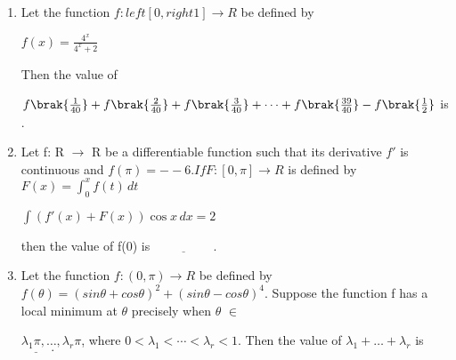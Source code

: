 \documentclass{article}
\begin{document}
\begin{enumerate}
\item Let the function $f:left[0, right1] \to R$ be defined by

      $f(x) = \frac{4^x}{4^x + 2}$
      
Then the value of
      
	$f\brak{\frac{1}{40}} + f\brak{\frac{2}{40}} + f\brak{\frac{3}{40}} + \dots + f\brak{\frac{39}{40}} - f\brak{\frac{1}{2}}$ 
	is \underline{\hspace{2cm}}.

\item Let f: R $\to$ R be a differentiable function such that its derivative $f'$ is continuous and $f(\pi) = --6.If F:[0,\pi] \to R $ is defined by $F(x) = \int_{0}^{x}f(t) \, dt$
    
    $\int ( f'(x) + F(x) ) \cos x \, dx = 2$

then the value of f(0) is $\underline{\hspace{2cm}}$.

\item Let the function $f: (0, \pi) \to R$ be defined by
      $f(\theta) = (sin\theta + cos\theta)^2 + (sin\theta - cos\theta)^4.$
      Suppose the function f has a local minimum at $\theta$ precisely when $\theta$ $\in$
       
       ${ \lambda_1 \pi, \dots, \lambda_r \pi}$, where  $0<\lambda_1 < \cdots < \lambda_r < 1$. Then the value of $\lambda_1 + \dots + \lambda_r$ is $\underline{\hspace{1cm}}.$
\end{enumerate}
     
\end{document}
